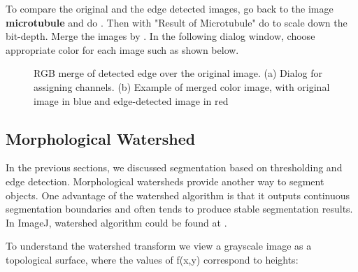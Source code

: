 \begin{indentexercise}{1}
To compare the original and the edge detected images, go back to the
image \textbf{microtubule} and do
. Then with "Result of Microtubule" do  
to scale down the bit-depth. Merge the images by
.
In the following dialog window, choose appropriate color for each
image such as shown below. 

\begin{figure}[H]
\centering
{}
\caption{ RGB merge of detected edge over the original
image. (a) Dialog for assigning channels. (b) Example of merged color image, with original image in blue and edge-detected image in red}
\label{fig:EdgeDetectChannelMerging}
\end{figure} 

\end{indentexercise}

\subsection{Morphological Watershed }

In the previous sections, we discussed segmentation based on thresholding and edge detection. Morphological watersheds provide another way to segment objects. One advantage of the watershed algorithm is that it outputs continuous segmentation boundaries and often tends to produce stable segmentation results. In ImageJ, watershed algorithm could be found at .

To understand the watershed transform we view a grayscale image as a
topological surface, where the values of f(x,y) correspond to heights:

